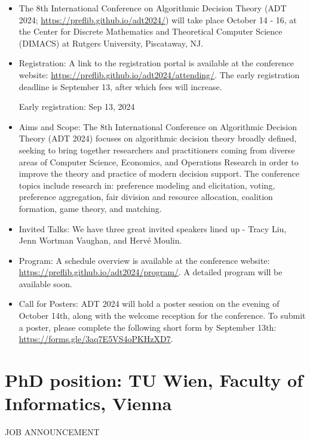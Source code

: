 \documentclass[prodmode,acmtecs]{acmsmall} %
\begin{document}
\begin{itemize}\item  The 8th International Conference on Algorithmic Decision Theory (ADT 2024; \href{https://preflib.github.io/adt2024/}{https://preflib.github.io/adt2024/}) will take place October 14 - 16, at the Center for Discrete Mathematics and Theoretical Computer Science (DIMACS) at Rutgers University, Piscataway, NJ. 
 
\item  Registration: A link to the registration portal is available at the conference website: \href{https://preflib.github.io/adt2024/attending/}{https://preflib.github.io/adt2024/attending/}. The early registration deadline is September 13, after which fees will increase. 
 
Early registration: Sep 13, 2024 
 
\item  Aims and Scope: The 8th International Conference on Algorithmic Decision Theory (ADT 2024) focuses on algorithmic decision theory broadly defined, seeking to bring together researchers and practitioners coming from diverse areas of Computer Science, Economics, and Operations Research in order to improve the theory and practice of modern decision support. The conference topics include research in: preference modeling and elicitation, voting, preference aggregation, fair division and resource allocation, coalition formation, game theory, and matching. 
 
\item  Invited Talks: We have three great invited speakers lined up - Tracy Liu, Jenn Wortman Vaughan, and Hervé Moulin. 
 
\item  Program: A schedule overview is available at the conference website: \href{https://preflib.github.io/adt2024/program/}{https://preflib.github.io/adt2024/program/}. A detailed program will be available soon. 
 
\item  Call for Posters: ADT 2024 will hold a poster session on the evening of October 14th, along with the welcome reception for the conference. To submit a poster, please complete the following short form by September 13th: \href{https://forms.gle/3aq7E5VS4oPKHzXD7}{https://forms.gle/3aq7E5VS4oPKHzXD7}. 
 
\end{itemize}\section{PhD position: TU Wien, Faculty of Informatics, Vienna}\label{PhDposition}JOB ANNOUNCEMENT 
\end{document}

